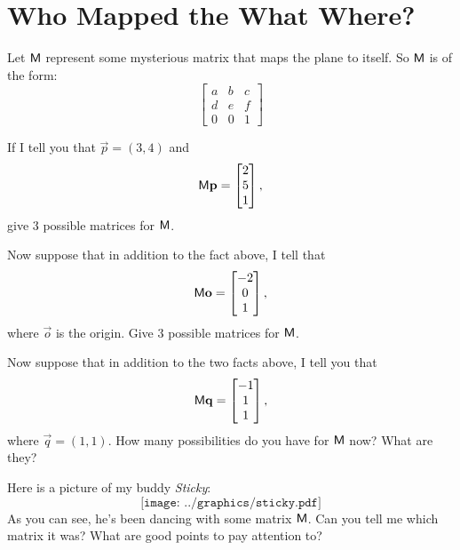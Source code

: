 \newpage
\section{Who Mapped the What Where?} 
                                  

Let $\mathsf{M}$ represent some mysterious matrix that maps the plane to itself.
So $\mathsf{M}$ is of the form:
\[
\begin{bmatrix}
a & b & c \\
d & e & f \\
0 & 0 & 1
\end{bmatrix}
\]

\begin{prob} 
If I tell you that $\vec{p} = (3,4)$ and 
\[
\mathsf{M}\mathbf{p} = \begin{bmatrix}2\\ 5\\ 1\end{bmatrix},
\]
give $3$ possible matrices for $\mathsf{M}$.
\end{prob}

\begin{prob} 
Now suppose that in addition to the fact above, I tell that
\[
\mathsf{M}\mathbf{o} = \begin{bmatrix}-2\\ 0\\ 1\end{bmatrix},
\]
where $\vec{o}$ is the origin.  Give $3$ possible matrices for
$\mathsf{M}$.
\end{prob}


\begin{prob} 
Now suppose that in addition to the two facts above, I tell you that 
\[
\mathsf{M}\mathbf{q} = \begin{bmatrix}-1\\ 1\\ 1\end{bmatrix},
\]
where $\vec{q} = (1,1)$.  How many possibilities do you have for
$\mathsf{M}$ now? What are they?
\end{prob}

\begin{prob}
Here is a picture of my buddy \textit{Sticky}:
\[
\texttt{[image: ../graphics/sticky.pdf]}
\]
As you can see, he's been dancing with some matrix $\mathsf{M}$. Can you
tell me which matrix it was? What are good points to pay attention to?
\end{prob}


